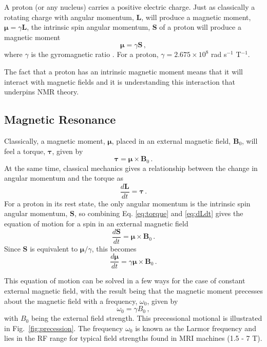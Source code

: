 A proton (or any nucleus) carries a positive electric charge.
Just as classically a rotating charge with angular momentum, $\mathbf{L}$, will produce a magnetic moment, $
\boldsymbol{\mu} = \gamma \mathbf{L}$, the intrinsic spin angular momentum, $\mathbf{S}$ of a proton will produce a magnetic moment 
\begin{equation}
\label{eq:magnmom}
\boldsymbol{\mu} = \gamma \mathbf{S} \,,
\end{equation}
where $\gamma$ is the gyromagnetic ratio \cite{Levitt2008}.
For a proton, $\gamma = 2.675 \times 10^8$ rad s$^{-1}$ T$^{-1}$.

The fact that a proton has an intrinsic magnetic moment means that it will interact with magnetic fields and it is understanding this interaction that underpins \ac{NMR} theory.


\subsection{Magnetic Resonance}
\label{sec:bg_resonance}
Classically, a magnetic moment, $\boldsymbol{\mu}$, placed in an external magnetic field, $\mathbf{B}_0$, will feel a torque, $\boldsymbol{\tau}$, given by \cite{Haacke1999} 
\begin{equation}
\label{eq:torque}
\boldsymbol{\tau} = \boldsymbol{\mu} \times \mathbf{B}_0 \,.
\end{equation}
At the same time, classical mechanics gives a relationship between the change in angular momentum and the torque as \cite{Haacke1999} 
\begin{equation}
\label{eq:dLdt}
\frac{d\mathbf{L}}{dt} = \boldsymbol{\tau}\,. 
\end{equation}
For a proton in its rest state, the only angular momentum is the intrinsic spin angular momentum, $\mathbf{S}$, so combining Eq. \ref{eq:torque} and \ref{eq:dLdt} gives the equation of motion for a spin in an external magnetic field
\begin{equation}
\frac{d\mathbf{S}}{dt} = \boldsymbol{\mu} \times \mathbf{B}_0 \,.
\end{equation}
Since $\mathbf{S}$ is equivalent to $\boldsymbol{\mu}/\gamma$, this becomes
\begin{equation}
\frac{d\boldsymbol{\mu}}{dt} = \gamma\boldsymbol{\mu} \times \mathbf{B}_0\,.
\label{eq:dmudt}
\end{equation}

This equation of motion can be solved in a few ways for the case of constant external magnetic field, with the result being that the magnetic moment precesses about the magnetic field with a frequency, $\omega_0$, given by\cite{Levitt2008}
\begin{equation}
\label{eq:LarmorFreq}
\omega_0 = \gamma B_0\,,
\end{equation}
with $B_0$ being the external field strength. 
This precessional motional is illustrated in Fig.\ \ref{fig:precession}.
The frequency $\omega_0$ is known as the Larmor frequency and lies in the \ac{RF} range for typical field strengths found in MRI machines (1.5 - 7 T).


